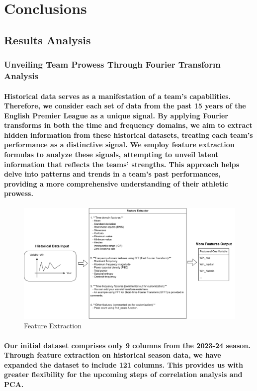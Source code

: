 \section{Conclusions}
% 
% 
\subsection{Results Analysis}
\subsubsection*{Unveiling Team Prowess Through Fourier Transform Analysis}
\paragraph{Historical data serves as a manifestation of a team's capabilities. Therefore, we consider each set of data from the past 15 years of the English Premier League as a unique signal. By applying Fourier transforms in both the time and frequency domains, we aim to extract hidden information from these historical datasets, treating each team's performance as a distinctive signal. We employ feature extraction formulas to analyze these signals, attempting to unveil latent information that reflects the teams' strengths. This approach helps delve into patterns and trends in a team's past performances, providing a more comprehensive understanding of their athletic prowess.}
% 
% 
% 
\begin{figure}[H]
    \includegraphics[width=\textwidth]{pic/feature.png}
    \caption{Feature Extraction}
\end{figure}
% 
% 
% 
% 
\paragraph{Our initial dataset comprises only 9 columns from the 2023-24 season. Through feature extraction on historical season data, we have expanded the dataset to include 121 columns. This provides us with greater flexibility for the upcoming steps of correlation analysis and PCA.}